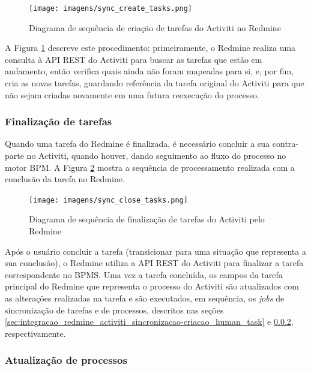 \begin{figure}[H]
\centering
\texttt{[image: imagens/sync\_create\_tasks.png]}
\caption{Diagrama de sequência de criação de tarefas do Activiti no Redmine}
\label{fig:sync_bpm_tasks}
\end{figure}

A Figura \ref{fig:sync_bpm_tasks} descreve este procedimento: primeiramente, o Redmine realiza uma consulta à API REST do Activiti para buscar as tarefas que estão em andamento, então verifica quais ainda não foram mapeadas para si, e, por fim, cria as novas tarefas, guardando referência da tarefa original do Activiti para que não sejam criadas novamente em uma futura reexecução do processo.

\subsubsection{Finalização de tarefas}\label{sec:integracao_redmine_activiti_sincronizacao-finalizacao_human_task}

Quando uma tarefa do Redmine é finalizada, é necessário concluir a sua contra-parte no Activiti, quando houver, dando seguimento ao fluxo do processo no motor BPM. A Figura \ref{fig:close_bpm_tasks} mostra a sequência de processamento realizada com a conclusão da tarefa no Redmine.

\begin{figure}[H]
\centering
\texttt{[image: imagens/sync\_close\_tasks.png]}
\caption{Diagrama de sequência de finalização de tarefas do Activiti pelo Redmine}
\label{fig:close_bpm_tasks}
\end{figure}

Após o usuário concluir a tarefa (transicionar para uma situação que representa a sua conclusão), o Redmine utiliza a API REST do Activiti para finalizar a tarefa correspondente no BPMS. Uma vez a tarefa concluída, os campos da tarefa principal do Redmine que representa o processo do Activiti são atualizados com as alterações realizadas na tarefa e são executados, em sequência, os \textit{jobs} de sincronização de tarefas e de processos, descritos nas seções \ref{sec:integracao_redmine_activiti_sincronizacao-criacao_human_task} e \ref{sec:integracao_redmine_activiti_sincronizacao-status_processo}, respectivamente.

\subsubsection{Atualização de processos}\label{sec:integracao_redmine_activiti_sincronizacao-status_processo}


